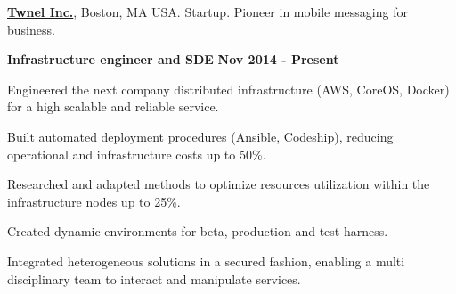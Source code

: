 \href{http://www.twnel.com/}{\textbf{Twnel Inc.}}, Boston, MA USA. Startup. 
Pioneer in mobile messaging for business.
\begin{outerlist}
\item[] \textbf{Infrastructure engineer and SDE} \hfill \textbf{Nov 2014 -
Present}
    \begin{innerlist}
\item Engineered the next company distributed infrastructure (AWS, CoreOS,
Docker) for a high scalable and reliable service.
\item Built automated deployment procedures (Ansible, Codeship), reducing
operational and infrastructure costs up to 50\%.
\item Researched and adapted methods to optimize resources utilization within
the infrastructure nodes up to 25\%.
\item Created dynamic environments for beta, production and test
harness.
\item Integrated heterogeneous solutions in a secured fashion, enabling a
multi disciplinary team to interact and manipulate services.
    \end{innerlist}
\end{outerlist}





%

% 

